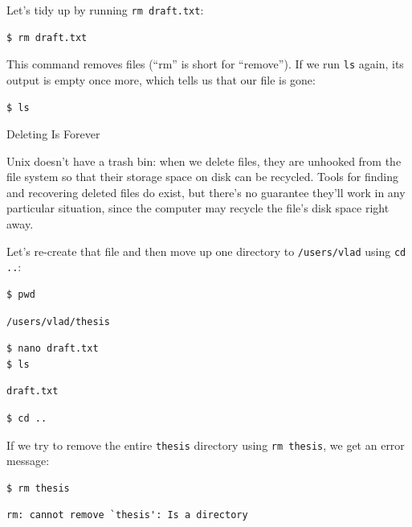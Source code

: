 \documentclass{book}
\begin{document}
Let's tidy up by running \texttt{rm draft.txt}:

\begin{verbatim}
$ rm draft.txt
\end{verbatim}

This command removes files (``rm'' is short for ``remove''). If we run
\texttt{ls} again, its output is empty once more, which tells us that
our file is gone:

\begin{verbatim}
$ ls
\end{verbatim}

\begin{swcbox}{Deleting Is Forever}

Unix doesn't have a trash bin: when we delete files, they are unhooked
from the file system so that their storage space on disk can be
recycled. Tools for finding and recovering deleted files do exist, but
there's no guarantee they'll work in any particular situation, since the
computer may recycle the file's disk space right away.

\end{swcbox}

Let's re-create that file and then move up one directory to
\texttt{/users/vlad} using \texttt{cd ..}:

\begin{verbatim}
$ pwd
\end{verbatim}

\begin{verbatim}
/users/vlad/thesis
\end{verbatim}

\begin{verbatim}
$ nano draft.txt
$ ls
\end{verbatim}

\begin{verbatim}
draft.txt
\end{verbatim}

\begin{verbatim}
$ cd ..
\end{verbatim}

If we try to remove the entire \texttt{thesis} directory using
\texttt{rm thesis}, we get an error message:

\begin{verbatim}
$ rm thesis
\end{verbatim}

\begin{verbatim}
rm: cannot remove `thesis': Is a directory
\end{verbatim}
\end{document}
